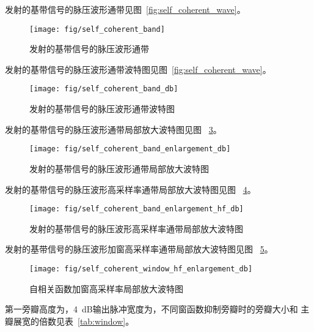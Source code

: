 \documentclass[../main]{subfiles}
\begin{document}
发射的基带信号的脉压波形通带见图~\ref{fig:self_coherent_wave}。

\begin{figure}[htbp]
  \centering
  \texttt{[image: fig/self\_coherent\_band]}
  \caption{发射的基带信号的脉压波形通带}%
  \label{fig:self_coherent_band}
\end{figure}

发射的基带信号的脉压波形通带波特图见图~\ref{fig:self_coherent_wave}。

\begin{figure}[htbp]
  \centering
  \texttt{[image: fig/self\_coherent\_band\_db]}
  \caption{发射的基带信号的脉压波形通带波特图}%
  \label{fig:self_coherent_band_db}
\end{figure}

发射的基带信号的脉压波形通带局部放大波特图见图%
~\ref{fig:self_coherent_band_enlargement_db}。

\begin{figure}[htbp]
  \centering
  \texttt{[image: fig/self\_coherent\_band\_enlargement\_db]}
  \caption{发射的基带信号的脉压波形通带局部放大波特图}%
  \label{fig:self_coherent_band_enlargement_db}
\end{figure}

发射的基带信号的脉压波形高采样率通带局部放大波特图见图%
~\ref{fig:self_coherent_hf_band_enlargement_db}。

\begin{figure}[htbp]
  \centering
  \texttt{[image: fig/self\_coherent\_band\_enlargement\_hf\_db]}
  \caption{发射的基带信号的脉压波形高采样率通带局部放大波特图}%
  \label{fig:self_coherent_hf_band_enlargement_db}
\end{figure}

发射的基带信号的脉压波形加窗高采样率通带局部放大波特图见图%
~\ref{fig:self_coherent_window_hf_enlargement_db}。

\begin{figure}[htbp]
  \centering
  \texttt{[image: fig/self\_coherent\_window\_hf\_enlargement\_db]}
  \caption{自相关函数加窗高采样率局部放大波特图}%
  \label{fig:self_coherent_window_hf_enlargement_db}
\end{figure}

\begin{Answer}[ref = ex:2]
  第一旁瓣高度为，\SI{4}{\dB}输出脉冲宽度为，不同窗函数抑制旁瓣时的旁瓣大小和
  主瓣展宽的倍数见表~\ref{tab:window}。
\end{Answer}
\end{document}
